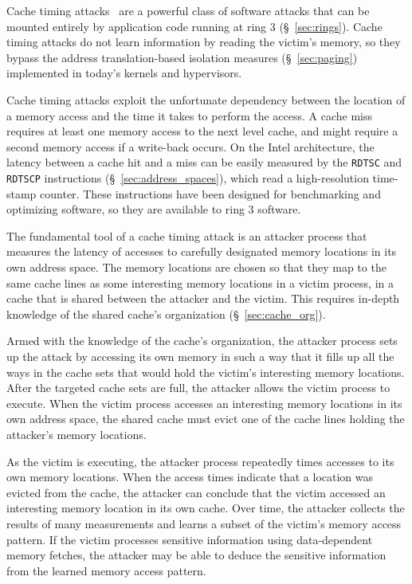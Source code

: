 \label{sec:cache_timing}

Cache timing attacks~\cite{banescu2011cache} are a powerful class of software
attacks that can be mounted entirely by application code running at ring 3
(\S~\ref{sec:rings}). Cache timing attacks do not learn information by reading
the victim's memory, so they bypass the address translation-based isolation
measures (\S~\ref{sec:paging}) implemented in today's kernels and hypervisors.



Cache timing attacks exploit the unfortunate dependency between the location of
a memory access and the time it takes to perform the access. A cache miss
requires at least one memory access to the next level cache, and might require
a second memory access if a write-back occurs. On the Intel architecture, the
latency between a cache hit and a miss can be easily measured by the
\texttt{RDTSC} and \texttt{RDTSCP} instructions (\S~\ref{sec:address_spaces}),
which read a high-resolution time-stamp counter. These instructions have been
designed for benchmarking and optimizing software, so they are available to
ring 3 software.

The fundamental tool of a cache timing attack is an attacker process that
measures the latency of accesses to carefully designated memory locations in
its own address space. The memory locations are chosen so that they map to
the same cache lines as some interesting memory locations in a victim process,
in a cache that is shared between the attacker and the victim. This requires
in-depth knowledge of the shared cache's organization (\S~\ref{sec:cache_org}).

Armed with the knowledge of the cache's organization, the attacker process
sets up the attack by accessing its own memory in such a way that it fills up
all the ways in the cache sets that would hold the victim's interesting memory
locations. After the targeted cache sets are full, the attacker allows the
victim process to execute. When the victim process accesses an interesting
memory locations in its own address space, the shared cache must evict one of
the cache lines holding the attacker's memory locations.

As the victim is executing, the attacker process repeatedly times accesses to
its own memory locations. When the access times indicate that a location was
evicted from the cache, the attacker can conclude that the victim accessed an
interesting memory location in its own cache. Over time, the attacker collects
the results of many measurements and learns a subset of the victim's memory
access pattern. If the victim processes sensitive information using
data-dependent memory fetches, the attacker may be able to deduce the sensitive
information from the learned memory access pattern.


